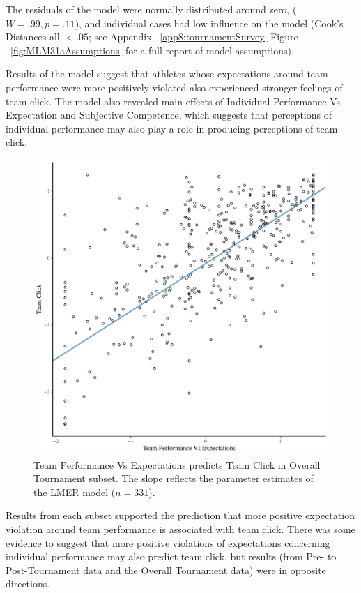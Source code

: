 \begin{CJK}{UTF8}{gbsn}
The residuals of the model were normally distributed around zero, ($W = .99, p = .11$), and individual cases had low influence on the model (Cook's Distances all $< .05$; see Appendix ~\ref{app8:tournamentSurvey} Figure ~\ref{fig:MLM31aAssumptions} for a full report of model assumptions).

Results of the model suggest that athletes whose expectations around team performance were more positively violated also experienced stronger feelings of team click.  The model also revealed main effects of Individual Performance Vs Expectation and Subjective Competence, which suggests that perceptions of individual performance may also play a role in producing perceptions of team click.


   \begin{figure}[htbp]
     \centering
   \includegraphics[scale=.5]{images/teamPerfClickOverallModelSlope.pdf}
     \caption{Team Performance Vs Expectations predicts Team Click in Overall Tournament subset.  The slope reflects the parameter estimates of the LMER model ($n = 331$).}
     \label{fig:teamPerfClickOverallModelSlope}
   \end{figure}



Results from each subset supported the prediction that more positive expectation violation around team performance is associated with team click.  There was some evidence to suggest that more positive violations of expectations concerning individual performance may also predict team click, but results (from Pre- to Post-Tournament data and the Overall Tournament data) were in
opposite directions.





\end{CJK}
